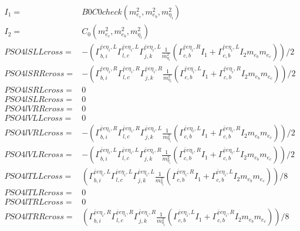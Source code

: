 \documentclass[A4,landscape]{article}
\begin{document}
\begin{align} 
I_1= & B0C0check(m^2_{e_{{c}}}, m^2_{e_{{b}}}, m^2_{\eta_i}) \\ 
I_2= & C_0(m^2_{e_{{c}}}, m^2_{e_{{b}}}, m^2_{\eta_i}) \\ 
  PSO4lSLLcross= & -( \Gamma^{\bar{e}e \eta_i ,L}_{b, i} \Gamma^{\bar{e}e \eta_i ,L}_{l, c} \Gamma^{\bar{e}e \eta_i ,L}_{j, k} \frac{1}{m^2_{\eta_i}} (\Gamma^{\bar{e}e \eta_i ,R}_{c, b} I_1 + \Gamma^{\bar{e}e \eta_i ,L}_{c, b} I_2 m_{e_{{b}}} m_{e_{{c}}}))/2 \\ 
  PSO4lSRRcross= & -( \Gamma^{\bar{e}e \eta_i ,R}_{b, i} \Gamma^{\bar{e}e \eta_i ,R}_{l, c} \Gamma^{\bar{e}e \eta_i ,R}_{j, k} \frac{1}{m^2_{\eta_i}} (\Gamma^{\bar{e}e \eta_i ,L}_{c, b} I_1 + \Gamma^{\bar{e}e \eta_i ,R}_{c, b} I_2 m_{e_{{b}}} m_{e_{{c}}}))/2 \\ 
  PSO4lSRLcross= & 0 \\ 
  PSO4lSLRcross= & 0 \\ 
  PSO4lVRRcross= & 0 \\ 
  PSO4lVLLcross= & 0 \\ 
  PSO4lVRLcross= & -( \Gamma^{\bar{e}e \eta_i ,R}_{b, i} \Gamma^{\bar{e}e \eta_i ,R}_{l, c} \Gamma^{\bar{e}e \eta_i ,L}_{j, k} \frac{1}{m^2_{\eta_i}} (\Gamma^{\bar{e}e \eta_i ,L}_{c, b} I_1 + \Gamma^{\bar{e}e \eta_i ,R}_{c, b} I_2 m_{e_{{b}}} m_{e_{{c}}}))/2 \\ 
  PSO4lVLRcross= & -( \Gamma^{\bar{e}e \eta_i ,L}_{b, i} \Gamma^{\bar{e}e \eta_i ,L}_{l, c} \Gamma^{\bar{e}e \eta_i ,R}_{j, k} \frac{1}{m^2_{\eta_i}} (\Gamma^{\bar{e}e \eta_i ,R}_{c, b} I_1 + \Gamma^{\bar{e}e \eta_i ,L}_{c, b} I_2 m_{e_{{b}}} m_{e_{{c}}}))/2 \\ 
  PSO4lTLLcross= & ( \Gamma^{\bar{e}e \eta_i ,L}_{b, i} \Gamma^{\bar{e}e \eta_i ,L}_{l, c} \Gamma^{\bar{e}e \eta_i ,L}_{j, k} \frac{1}{m^2_{\eta_i}} (\Gamma^{\bar{e}e \eta_i ,R}_{c, b} I_1 + \Gamma^{\bar{e}e \eta_i ,L}_{c, b} I_2 m_{e_{{b}}} m_{e_{{c}}}))/8 \\ 
  PSO4lTLRcross= & 0 \\ 
  PSO4lTRLcross= & 0 \\ 
  PSO4lTRRcross= & ( \Gamma^{\bar{e}e \eta_i ,R}_{b, i} \Gamma^{\bar{e}e \eta_i ,R}_{l, c} \Gamma^{\bar{e}e \eta_i ,R}_{j, k} \frac{1}{m^2_{\eta_i}} (\Gamma^{\bar{e}e \eta_i ,L}_{c, b} I_1 + \Gamma^{\bar{e}e \eta_i ,R}_{c, b} I_2 m_{e_{{b}}} m_{e_{{c}}}))/8 \\ 
\end{align} 
\end{document}
